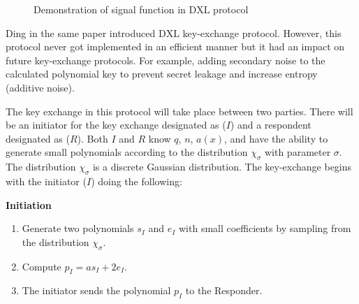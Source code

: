 \begin{figure}[H]
\begin{center}
		\end{center}
		\caption{Demonstration of signal function in $\mathrm{DXL}$ protocol}
\end{figure}



Ding in the same paper introduced $\mathrm{DXL}$ key-exchange protocol. However, this protocol never got implemented in an efficient manner but it had an impact on future key-exchange protocols. For example, adding secondary noise to the calculated polynomial key to prevent secret leakage and increase entropy (additive noise).

The key exchange in this protocol will take place between two parties. There will be an initiator for the key exchange designated as ($I$) and a respondent designated as ($R$). Both $I$ and $R$ know $q$, $n$, $a(x)$, and have the ability to generate small polynomials according to the distribution $\chi_{\sigma}$ with parameter $\sigma$. The distribution $\chi_{\sigma}$ is a discrete Gaussian distribution. The key-exchange begins with the initiator ($I$) doing the following:

\noindent\textbf{Initiation}
\begin{enumerate}
    \item Generate two polynomials $s_{I}$ and $e_{I}$ with small coefficients by sampling from the distribution $\chi _{\sigma }$.
    \item Compute $p_{I}=as_{I}+2e_{I}$.
    \item The initiator sends the polynomial $p_{I}$ to the Responder.
\end{enumerate}

